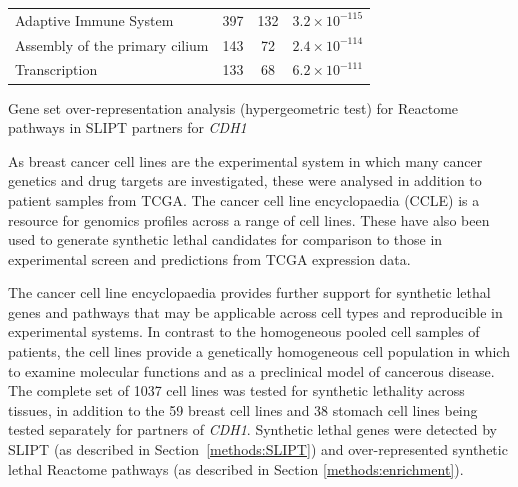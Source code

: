 \begin{table}[!b]
{\begin{threeparttable}
\begin{tabular}{lccc}
  \rowcolor{black!5}
  Adaptive Immune System & 397 & 132 & $3.2 \times 10^{-115}$ \\ 
  \rowcolor{black!10}
  Assembly of the primary cilium & 143 &  72 & $2.4 \times 10^{-114}$ \\ 
  \rowcolor{black!5}
  Transcription & 133 &  68 & $6.2 \times 10^{-111}$ \\ 
   \hline
\end{tabular}
\begin{tablenotes}
\raggedright \small
Gene set over-representation analysis (hypergeometric test) for Reactome pathways in SLIPT partners for \textit{CDH1}
\end{tablenotes}
\end{threeparttable}
}
\end{table}

As breast cancer cell lines are the experimental system in which many cancer genetics and drug targets are investigated, these were analysed in addition to patient samples from TCGA. The cancer cell line encyclopaedia (CCLE) is a resource for genomics profiles across a range of cell lines. These have also been used to generate synthetic lethal candidates for comparison to those in experimental screen and predictions from TCGA expression data.

The cancer cell line encyclopaedia provides further support for synthetic lethal genes and pathways that may be applicable across cell types and reproducible in experimental systems. In contrast to the homogeneous pooled cell samples of patients,  the cell lines provide a genetically homogeneous cell population in which to examine molecular functions and as a preclinical model of cancerous disease. The complete set of 1037 cell lines was tested for synthetic lethality across tissues, in addition to the 59 breast cell lines and 38 stomach cell lines being tested separately for partners of \textit{CDH1}. Synthetic lethal genes were detected by SLIPT (as described in Section~\ref{methods:SLIPT}) and over-represented synthetic lethal Reactome pathways (as described in Section \ref{methods:enrichment}). 

